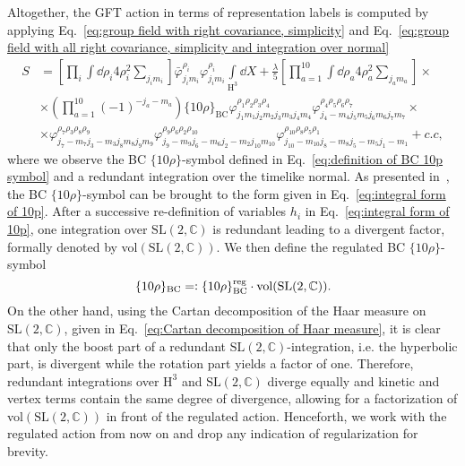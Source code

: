 \documentclass[11pt,a4paper]{article}
\newcommand{\C}{\mathbb C}
\newcommand{\SL}{\text{SL$(2,\C)$}}
\newcommand{\HH}{\text{H}^3}
\newcommand{\eqdef}{=\vcentcolon}
\begin{document}
Altogether, the GFT action in terms of representation labels is computed by applying Eq.~\eqref{eq:group field with right covariance, simplicity} and Eq.~\eqref{eq:group field with all right covariance, simplicity and integration over normal} 
%
\begin{equation}\label{eq:BO action in spin representation}
\begin{aligned}
S 
& = 
\left[\prod_i \int\dd{\rho_i}4\rho_i^2\sum_{j_i m_i}\right]\bar{\varphi}^{\rho_i}_{j_i m_i}\varphi^{\rho_i}_{j_i m_i}\int\limits_{\HH}\dd{X}+\frac{\lambda}{5}\left[\prod_{a=1}^{10}\int\dd{\rho_a}4\rho_a^2\sum_{j_a m_a}\right]\times\\[7pt]
& \times
\left(\prod_{a=1}^{10}(-1)^{-j_a-m_a}\right)\{10\rho\}_{\text{BC}}\varphi^{\rho_1 \rho_2 \rho_3 \rho_4}_{j_1 m_1 j_2 m_2 j_3 m_3 j_4 m_4}\varphi^{\rho_4 \rho_5 \rho_6 \rho_7}_{j_4 -m_4 j_5 m_5 j_6 m_6 j_7 m_7}\times\\[7pt]
& \times
\varphi^{\rho_7 \rho_3 \rho_8 \rho_9}_{j_7 -m_7 j_3 -m_3 j_8 m_8 j_9 m_9}\varphi^{\rho_9 \rho_6 \rho_2 \rho_{10}}_{j_9 -m_9 j_6 -m_6 j_2 -m_2 j_{10} m_{10}}\varphi^{\rho_{10} \rho_8 \rho_5 \rho_1}_{j_{10} -m_{10} j_8 -m_8 j_5 -m_5 j_1 -m_1}+c.c,
\end{aligned}
\end{equation}
%
where we observe the BC $\{10\rho\}$-symbol defined in Eq.~\eqref{eq:definition of BC 10p symbol} and a redundant integration over the timelike normal. As presented in~\cite{Perez:2000ec}, the BC $\{10\rho\}$-symbol can be brought to the form given in Eq.~\eqref{eq:integral form of 10p}. After a successive re-definition of variables $h_i$ in Eq.~\eqref{eq:integral form of 10p}, one integration over $\SL$ is redundant leading to a divergent factor, formally denoted by vol$(\SL)$. We then define the regulated BC $\{10\rho\}$-symbol
%
\begin{equation}\label{eq:definition of regulated BC 10p}
\{10\rho\}_{\text{BC}}
\eqdef
\{10\rho\}_{\text{BC}}^{\text{reg}}\cdot \text{vol}(\SL).
\end{equation}
%
On the other hand, using the Cartan decomposition of the Haar measure on $\SL$, given in Eq.~\eqref{eq:Cartan decomposition of Haar measure}, it is clear that only the boost part of a redundant $\SL$-integration, i.e. the hyperbolic part, is divergent while the rotation part yields a factor of one. Therefore, redundant integrations over $\HH$ and $\SL$ diverge equally and kinetic and vertex terms contain the same degree of divergence, allowing for a factorization of vol$(\SL)$ in front of the regulated action. Henceforth, we work with the regulated action from now on and drop any indication of regularization for brevity.
\end{document}
